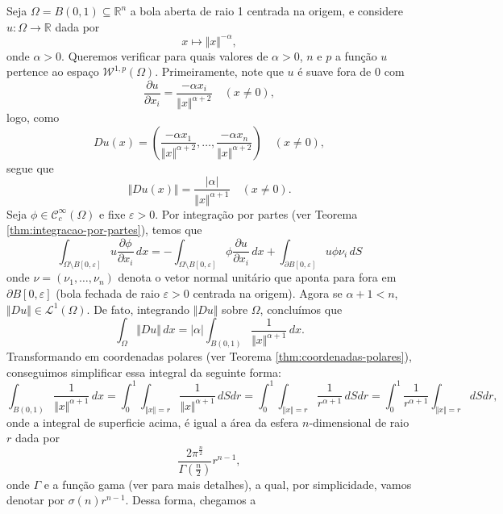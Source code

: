 \documentclass[a4paper, 11pt]{book}
\theoremstyle{definition}
\newcommand{\bR}{\mathbb{R}}
\newcommand{\cC}{\mathcal{C}}
\newcommand{\cL}{\mathcal{L}}
\newcommand{\cW}{\mathcal{W}}
\begin{document}
\begin{ex}
    Seja $\Omega = B(0,1) \subseteq \bR^n$ a bola aberta de raio 1 centrada na origem, e considere $u : \Omega \to \bR$ dada por
    \begin{equation} \label{eq:po}
        x \mapsto \Vert x \Vert^{-\alpha},
    \end{equation}
    onde $\alpha > 0$. Queremos verificar para quais valores de $\alpha > 0$, $n$ e $p$ a função $u$ pertence ao espaço $\cW^{1,p}(\Omega)$.
    Primeiramente, note que $u$ é suave fora de $0$ com
    \[
        \dfrac{\partial u}{\partial x_i} = \frac{-\alpha x_i}{\Vert x \Vert^{\alpha + 2}} \quad (x \neq 0),
    \]
    logo, como
    \[
        Du(x) = \left(\frac{-\alpha x_1}{\Vert x \Vert^{\alpha + 2}},\dots,\frac{-\alpha x_n}{\Vert x \Vert^{\alpha + 2}}  \right) \quad (x \neq 0),
    \]
    segue que
    \[
        \Vert Du(x) \Vert = \frac{|\alpha|}{\Vert x \Vert^{\alpha + 1}} \quad (x \neq 0).
    \]
    Seja $\phi \in \cC^\infty_c(\Omega)$ e fixe $\varepsilon > 0$. Por integração por partes (ver Teorema \ref{thm:integracao-por-partes}), temos que
    \begin{equation} \label{eq:op}
        \int_{\Omega \setminus B[0, \varepsilon]} u \dfrac{\partial \phi}{\partial x_i} \, dx = -\int_{\Omega \setminus B[0, \varepsilon]} \phi \dfrac{\partial u}{\partial x_i} \,dx + \int_{\partial B[0,\varepsilon]} u \phi \nu_i \,dS
    \end{equation}
    onde $\nu = (\nu_1,\dots,\nu_n)$ denota o vetor normal unitário que aponta para fora em $\partial B[0,\varepsilon]$ (bola fechada de raio $\varepsilon > 0  $ centrada na origem).
    Agora se $\alpha + 1 < n$, $\Vert Du \Vert \in \cL^1(\Omega)$.
    De fato, integrando $\Vert Du \Vert$ sobre $\Omega$, concluímos que
    \[
        \int_\Omega \Vert Du \Vert \,dx = |\alpha|\int_{B(0,1)} \frac{1}{\Vert x \Vert^{\alpha+1}} \,dx.
    \]
    Transformando em coordenadas polares (ver Teorema \ref{thm:coordenadas-polares}), conseguimos simplificar essa integral da seguinte forma:
    \[
        \int_{B(0,1)} \frac{1}{\Vert x \Vert^{\alpha+1}} \,dx =  \int_0^1 \int_{\Vert x \Vert = r} \frac{1}{\Vert x \Vert^{\alpha + 1}} \,dS dr = \int_0^1 \int_{\Vert x \Vert= r} \frac{1}{r^{\alpha + 1}} \, dS dr = \int_0^1 \frac{1}{r^{\alpha+1}}  \int_{\Vert x \Vert = r} dS dr,
    \]
    onde a integral de superficie acima, é igual a área da esfera $n$-dimensional de raio $r$ dada por
    \[
        \frac{2\pi^{\frac{n}{2}}}{\Gamma(\frac{n}{2})}r^{n-1},
    \]
    onde $\Gamma$ e a função gama (ver \cite{artin-gamma} para mais detalhes), a qual, por simplicidade, vamos denotar por $\sigma(n) r^{n-1}$. Dessa forma, chegamos a

\end{ex}
\end{document}
